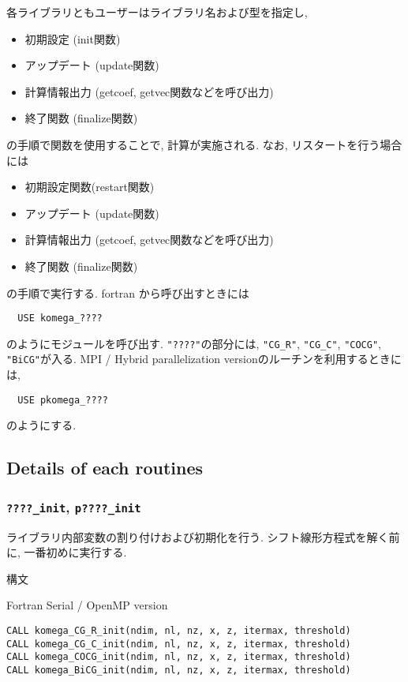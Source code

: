 \documentclass[12pt,titlepage]{article}
\begin{document}
各ライブラリともユーザーはライブラリ名および型を指定し, 
\begin{itemize}
\item 初期設定 (init関数)
\item アップデート (update関数)
\item 計算情報出力 (getcoef, getvec関数などを呼び出力)
\item 終了関数 (finalize関数)
\end{itemize}
の手順で関数を使用することで, 計算が実施される. 
なお, リスタートを行う場合には
\begin{itemize}
\item 初期設定関数(restart関数)
\item アップデート (update関数)
\item 計算情報出力 (getcoef, getvec関数などを呼び出力)
\item 終了関数 (finalize関数)
\end{itemize}
の手順で実行する.
fortran から呼び出すときには
\begin{verbatim}
  USE komega_????
\end{verbatim}
のようにモジュールを呼び出す. \verb|"????"|の部分には,
\verb|"CG_R"|, \verb|"CG_C"|, \verb|"COCG"|, \verb|"BiCG"|が入る.
MPI / Hybrid parallelization versionのルーチンを利用するときには,
\begin{verbatim}
  USE pkomega_????
\end{verbatim}
のようにする.

\subsection{Details of each routines}

\subsubsection{\texttt{????\_init}, \texttt{p????\_init}}

ライブラリ内部変数の割り付けおよび初期化を行う.
シフト線形方程式を解く前に, 一番初めに実行する.

\noindent 構文

\noindent Fortran Serial / OpenMP version
\begin{verbatim}
CALL komega_CG_R_init(ndim, nl, nz, x, z, itermax, threshold)
CALL komega_CG_C_init(ndim, nl, nz, x, z, itermax, threshold)
CALL komega_COCG_init(ndim, nl, nz, x, z, itermax, threshold)
CALL komega_BiCG_init(ndim, nl, nz, x, z, itermax, threshold)
\end{verbatim}
\end{document}
